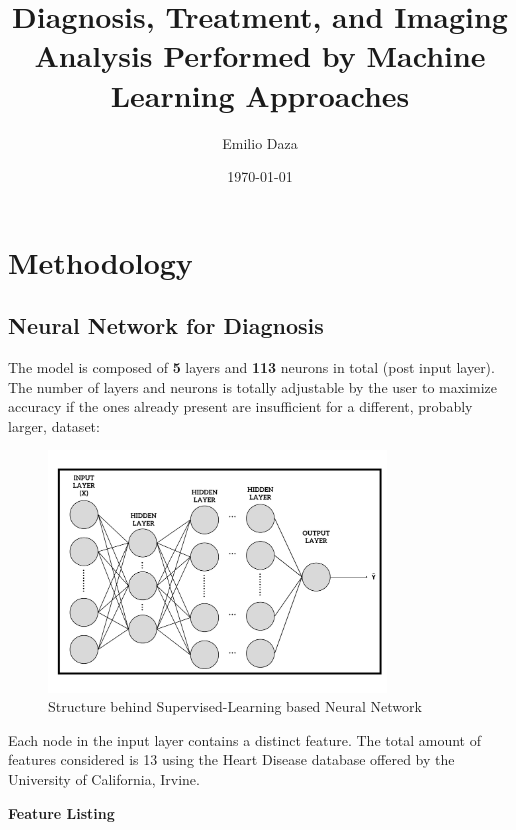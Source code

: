 \documentclass[12pt]{article}
\title{Diagnosis, Treatment, and Imaging Analysis Performed by Machine Learning Approaches}
\author{Emilio Daza}
\date{\today}
\begin{document}
\maketitle

\section{Methodology}
\subsection*{Neural Network for Diagnosis}

\indent The model is composed of \textbf{5} layers and \textbf{113} neurons in total (post input layer). The number of layers and neurons is totally adjustable by the user to maximize accuracy if the ones already present are insufficient for a different, probably larger, dataset:

\begin{figure}[h]
  \centering
  \includegraphics[width=0.8\textwidth]{Neural Network.png}
  \caption{Structure behind Supervised-Learning based Neural Network}
\end{figure}

Each node in the input layer contains a distinct feature. The total amount of features considered is 13 using the Heart Disease database offered by the University of California, Irvine.

\textbf{Feature Listing}
\end{document}
